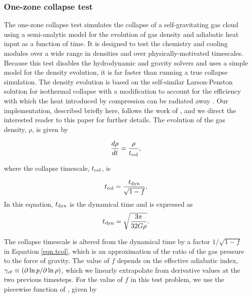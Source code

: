 \subsubsection{One-zone collapse test}
\label{sec.tests.1-zone}

The one-zone collapse test simulates the collapse of a
self-gravitating gas cloud using a semi-analytic model for the
evolution of gas density and adiabatic heat input as a function of
time.  It is designed to test the chemistry and cooling modules over a
wide range in densities and over physically-motivated timescales.
Because this test disables the hydrodynamic and gravity solvers and
uses a simple model for the density evolution, it is far faster than
running a true collapse simulation.  The density evolution is based on
the self-similar Larson-Penston \citep{1969MNRAS.145..271L,
1969MNRAS.144..425P} solution for isothermal collapse with a
modification to account for the efficiency with which the heat
introduced by compression can be radiated away
\citep{1983ApJ...265.1047Y}.  Our implementation, described briefly
here, follows the work of \citet{2005ApJ...626..627O}, and we direct
the interested reader to this paper for further details.  The
evolution of the gas density, $\rho$, is given by

\begin{equation}
\frac{d\rho}{dt} = \frac{\rho}{t_{\rm col}},
\end{equation}

where the collapse timescale, $t_{\rm col}$, is

\begin{equation} \label{eqn.tcol}
t_{\rm col} = \frac{t_{\rm dyn}}{\sqrt{1 - f}},
\end{equation}
In this equation, $t_{\rm dyn}$ is the dynamical time and is expressed as
\begin{equation}
t_{\rm dyn} = \sqrt{\frac{3 \pi}{32 G \rho}}.
\end{equation}

 The collapse timescale is altered from the dynamical time by a factor
$1/\sqrt{1-f}$ in Equation
\ref{eqn.tcol}, which is an approximation of the ratio of the gas
pressure to the force of gravity.  The value of $f$ depends on the
effective adiabatic index, $\gamma_{\rm ef} \equiv (\partial \ln p
/ \partial \ln \rho)$, which we linearly extrapolate
from derivative values at the two previous timesteps.  For the value
of $f$ in this test problem, we use the piecewise function of
\citet{2005ApJ...626..627O}, given by

